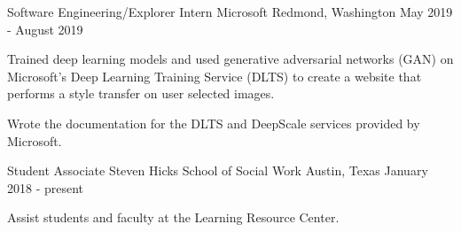 

\begin{cventries}

\cventry
    {Software Engineering/Explorer Intern} %
    {Microsoft} %
    {Redmond, Washington} %
    {May 2019 - August 2019} %
    {
      \begin{cvitems}
      \item {Trained deep learning models and used generative adversarial networks (GAN) on Microsoft’s Deep Learning Training Service (DLTS) to create a website that performs a style transfer on user selected images.}
      \item {Wrote the documentation for the DLTS and DeepScale services provided by Microsoft.}
      \end{cvitems}
    }

\cventry
    {Student Associate} %
    {Steven Hicks School of Social Work} %
    {Austin, Texas} %
    {January 2018 - present} %
    {
      \begin{cvitems}
      \item {Assist students and faculty at the Learning Resource Center.}
      \end{cvitems}
    }

\end{cventries}
